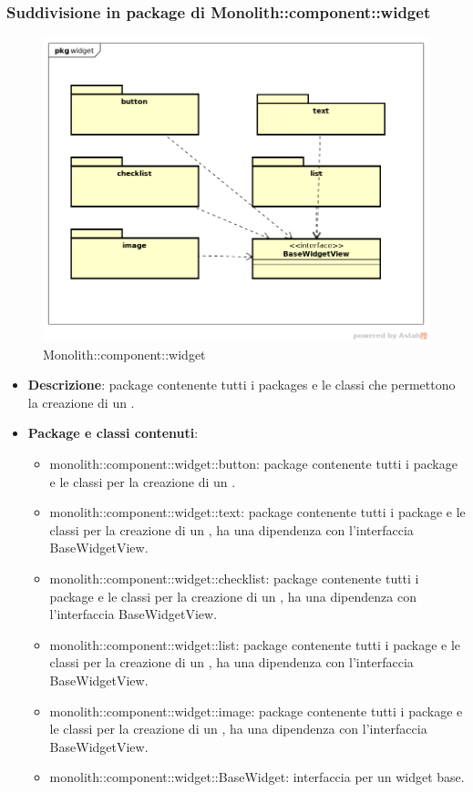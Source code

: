 \subsubsection{Suddivisione in package  di Monolith::component::widget}
\label{Monolith::component::widget}
\begin{figure}[H]
	\centering
	\includegraphics[scale=0.5]{Sezioni/imgPackage/component_widget.png}
	\caption{Monolith::component::widget}
\end{figure}
\begin{itemize}
	\item{\textbf{Descrizione}}: package contenente tutti i packages e le classi che permettono la creazione di un .
	\item{\textbf{Package e classi contenuti}}:
	\begin{itemize}
	\item{monolith::component::widget::button}: package contenente tutti i package e le classi per la creazione di un .
	\item{monolith::component::widget::text}: package contenente tutti i package e le classi per la creazione di un , ha una dipendenza con l'interfaccia BaseWidgetView.
	\item{monolith::component::widget::checklist}: package contenente tutti i package e le classi per la creazione di un , ha una dipendenza con l'interfaccia BaseWidgetView.
	\item{monolith::component::widget::list}: package contenente tutti i package e le classi per la creazione di un , ha una dipendenza con l'interfaccia BaseWidgetView.
	\item{monolith::component::widget::image}: package contenente tutti i package e le classi per la creazione di un , ha una dipendenza con l'interfaccia BaseWidgetView.
	\item{monolith::component::widget::BaseWidget}: interfaccia per un widget base.
	\end{itemize}

\end{itemize}

